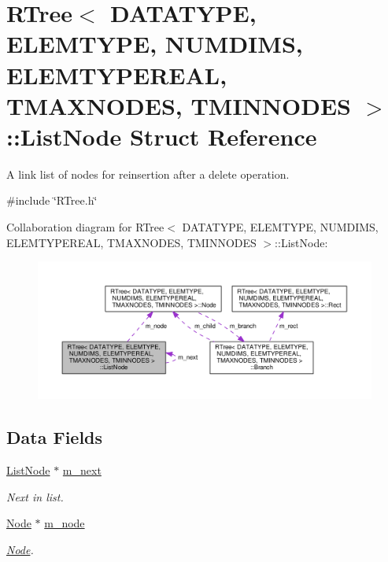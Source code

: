 \hypertarget{structRTree_1_1ListNode}{\section{R\-Tree$<$ D\-A\-T\-A\-T\-Y\-P\-E, E\-L\-E\-M\-T\-Y\-P\-E, N\-U\-M\-D\-I\-M\-S, E\-L\-E\-M\-T\-Y\-P\-E\-R\-E\-A\-L, T\-M\-A\-X\-N\-O\-D\-E\-S, T\-M\-I\-N\-N\-O\-D\-E\-S $>$\-:\-:List\-Node Struct Reference}
\label{structRTree_1_1ListNode}
}


A link list of nodes for reinsertion after a delete operation.  




{\ttfamily \#include \char`\"{}R\-Tree.\-h\char`\"{}}



Collaboration diagram for R\-Tree$<$ D\-A\-T\-A\-T\-Y\-P\-E, E\-L\-E\-M\-T\-Y\-P\-E, N\-U\-M\-D\-I\-M\-S, E\-L\-E\-M\-T\-Y\-P\-E\-R\-E\-A\-L, T\-M\-A\-X\-N\-O\-D\-E\-S, T\-M\-I\-N\-N\-O\-D\-E\-S $>$\-:\-:List\-Node\-:\nopagebreak
\begin{figure}[H]
\begin{center}
\leavevmode
\includegraphics[width=350pt]{structRTree_1_1ListNode__coll__graph}
\end{center}
\end{figure}
\subsection*{Data Fields}
\begin{DoxyCompactItemize}
\item 
\hyperlink{structRTree_1_1ListNode}{List\-Node} $\ast$ \hyperlink{structRTree_1_1ListNode_a9812899d8953b03f1772522b668942e3}{m\-\_\-next}
\begin{DoxyCompactList}\small\item\em Next in list. \end{DoxyCompactList}\item 
\hyperlink{structRTree_1_1Node}{Node} $\ast$ \hyperlink{structRTree_1_1ListNode_ade4b7e322e04e0a71b4e14cde8e73dca}{m\-\_\-node}
\begin{DoxyCompactList}\small\item\em \hyperlink{structRTree_1_1Node}{Node}. \end{DoxyCompactList}\end{DoxyCompactItemize}


